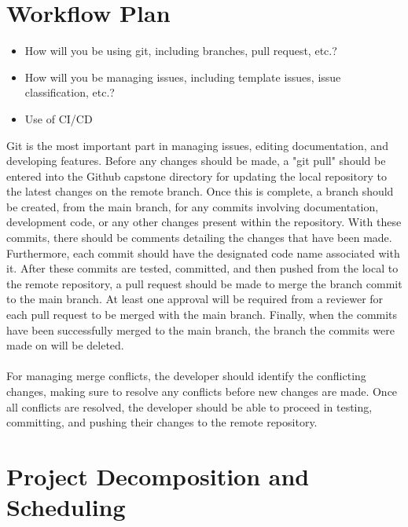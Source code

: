 \documentclass{article}
\begin{document}
\section{Workflow Plan}

\begin{itemize}
	\item How will you be using git, including branches, pull request, etc.?
	\item How will you be managing issues, including template issues, issue
	classification, etc.?
  \item Use of CI/CD
\end{itemize}

Git is the most important part in managing issues, editing documentation, and developing features.
Before any changes should be made, a "git pull" should be entered into the Github capstone directory
for updating the local repository to the latest changes on the remote branch.
Once this is complete, a branch should be created, from the main branch, for any commits involving
documentation, development code, or any other changes present within the repository.
With these commits, there should be comments detailing the changes that have been made.
Furthermore, each commit should have the designated code name associated with it.
After these commits are tested, committed, and then pushed from the local to the remote repository,
a pull request should be made to merge the branch commit to the main branch. 
At least one approval will be required from a reviewer for each pull request
to be merged with the main branch. Finally, when the commits have been successfully
merged to the main branch, the branch the commits were made on will be deleted.
\\
\\
\indent For managing merge conflicts, the developer should identify the conflicting changes,
making sure to resolve any conflicts before new changes are made. Once all conflicts
are resolved, the developer should be able to proceed in testing, committing, and pushing
their changes to the remote repository.

\section{Project Decomposition and Scheduling}
\end{document}
